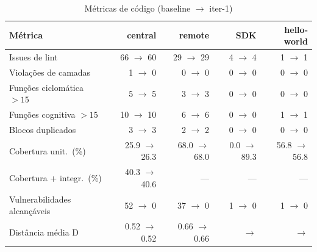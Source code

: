\begin{table}[htbp]
  \centering\small
  \caption{Métricas de código (baseline $\to$ iter-1)}
  \label{tab:metricas-antes-depois}
  \begin{tabular}{lrrrr}
    \toprule
    Métrica & central & remote & SDK & hello-world \\
    \midrule
    Issues de lint & 66 $\to$ 60 & 29 $\to$ 29 & 4 $\to$ 4 & 1 $\to$ 1 \\
    Violações de camadas & 1 $\to$ 0 & 0 $\to$ 0 & 0 $\to$ 0 & 0 $\to$ 0 \\
    Funções ciclomática $>15$ & 5 $\to$ 5 & 3 $\to$ 3 & 0 $\to$ 0 & 0 $\to$ 0 \\
    Funções cognitiva $>15$ & 10 $\to$ 10 & 6 $\to$ 6 & 0 $\to$ 0 & 1 $\to$ 1 \\
    Blocos duplicados & 3 $\to$ 3 & 2 $\to$ 2 & 0 $\to$ 0 & 0 $\to$ 0 \\
    Cobertura unit.\ (\%) & 25.9 $\to$ 26.3 & 68.0 $\to$ 68.0 & 0.0 $\to$ 89.3 & 56.8 $\to$ 56.8 \\
    Cobertura + integr.\ (\%) & 40.3 $\to$ 40.6 & --- & --- & --- \\
    Vulnerabilidades alcançáveis & 52 $\to$ 0 & 37 $\to$ 0 & 1 $\to$ 0 & 1 $\to$ 0 \\
    Distância média D & 0.52 $\to$ 0.52 & 0.66 $\to$ 0.66 &  $\to$  &  $\to$  \\
    \bottomrule
  \end{tabular}
\end{table}
